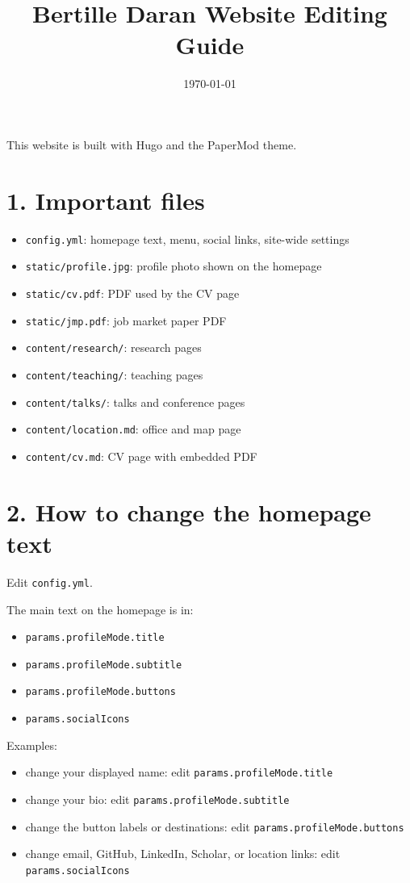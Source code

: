\documentclass[11pt]{article}
\title{Bertille Daran Website Editing Guide}
\author{}
\date{\today}
\begin{document}
\maketitle

This website is built with Hugo and the PaperMod theme.

\section*{1. Important files}
\begin{itemize}
\item \texttt{config.yml}: homepage text, menu, social links, site-wide settings
\item \texttt{static/profile.jpg}: profile photo shown on the homepage
\item \texttt{static/cv.pdf}: PDF used by the CV page
\item \texttt{static/jmp.pdf}: job market paper PDF
\item \texttt{content/research/}: research pages
\item \texttt{content/teaching/}: teaching pages
\item \texttt{content/talks/}: talks and conference pages
\item \texttt{content/location.md}: office and map page
\item \texttt{content/cv.md}: CV page with embedded PDF
\end{itemize}

\section*{2. How to change the homepage text}
Edit \texttt{config.yml}.

The main text on the homepage is in:
\begin{itemize}
\item \texttt{params.profileMode.title}
\item \texttt{params.profileMode.subtitle}
\item \texttt{params.profileMode.buttons}
\item \texttt{params.socialIcons}
\end{itemize}

Examples:
\begin{itemize}
\item change your displayed name: edit \texttt{params.profileMode.title}
\item change your bio: edit \texttt{params.profileMode.subtitle}
\item change the button labels or destinations: edit \texttt{params.profileMode.buttons}
\item change email, GitHub, LinkedIn, Scholar, or location links: edit \texttt{params.socialIcons}
\end{itemize}
\end{document}
